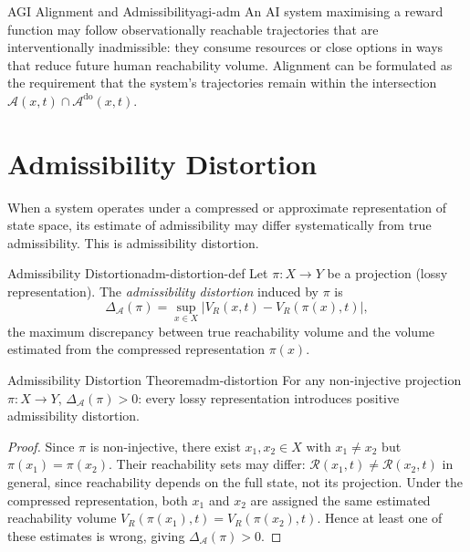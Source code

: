 \documentclass[12pt,twoside,openright]{book}
\newcommand{\csicon} {\marginpar{\tiny\color{DistBlue}\faCode}}
\newcommand{\reach}{\mathcal{R}}
\newcommand{\adm}{\mathcal{A}}
\begin{document}
\begin{example}{AGI Alignment and Admissibility}{agi-adm}
  \csicon
  An AI system maximising a reward function may follow
  observationally reachable trajectories that are
  interventionally inadmissible: they consume resources or
  close options in ways that reduce future human
  reachability volume. Alignment can be formulated as the
  requirement that the system's trajectories remain within
  the intersection $\adm(x,t)\cap\adm^\mathrm{do}(x,t)$.
\end{example}

\section{Admissibility Distortion}
\label{sec:ch14-distortion}

When a system operates under a compressed or approximate
representation of state space, its estimate of
admissibility may differ systematically from true
admissibility. This is admissibility distortion.

\begin{definition}{Admissibility Distortion}{adm-distortion-def}
  Let $\pi:X\to Y$ be a projection (lossy representation).
  The \emph{admissibility distortion} induced by $\pi$ is
  \[
    \Delta_\adm(\pi)
    = \sup_{x\in X} |V_R(x,t) - V_R(\pi(x),t)|,
  \]
  the maximum discrepancy between true reachability volume
  and the volume estimated from the compressed
  representation $\pi(x)$.
\end{definition}

\begin{theorem}{Admissibility Distortion Theorem}{adm-distortion}
  For any non-injective projection $\pi:X\to Y$,
  $\Delta_\adm(\pi) > 0$: every lossy representation
  introduces positive admissibility distortion.
\end{theorem}

\begin{proof}
  Since $\pi$ is non-injective, there exist
  $x_1,x_2\in X$ with $x_1\ne x_2$ but
  $\pi(x_1)=\pi(x_2)$. Their reachability sets may differ:
  $\reach(x_1,t)\ne\reach(x_2,t)$ in general, since
  reachability depends on the full state, not its
  projection. Under the compressed representation, both
  $x_1$ and $x_2$ are assigned the same estimated
  reachability volume $V_R(\pi(x_1),t)=V_R(\pi(x_2),t)$.
  Hence at least one of these estimates is wrong, giving
  $\Delta_\adm(\pi)>0$.
\end{proof}
\end{document}
